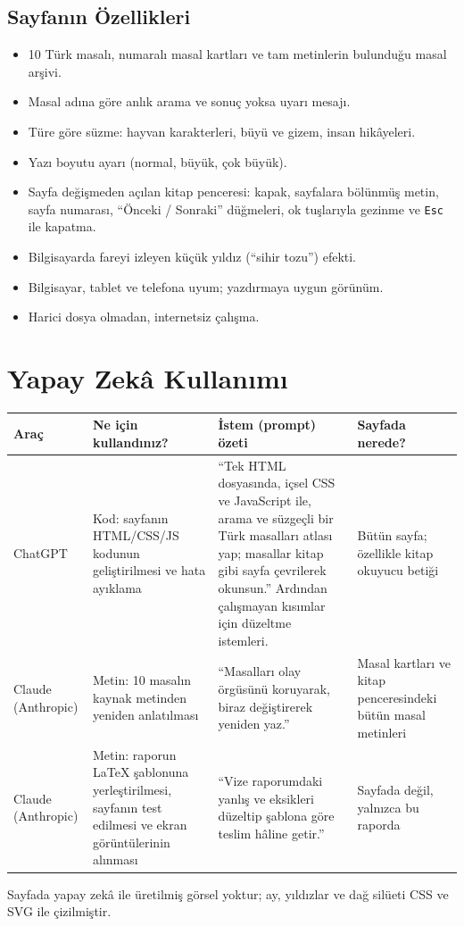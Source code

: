 \documentclass[12pt,a4paper]{article}
\begin{document}
\subsection{Sayfanın Özellikleri}
\begin{itemize}
  \item 10 Türk masalı, numaralı masal kartları ve tam metinlerin bulunduğu masal arşivi.
  \item Masal adına göre anlık arama ve sonuç yoksa uyarı mesajı.
  \item Türe göre süzme: hayvan karakterleri, büyü ve gizem, insan hikâyeleri.
  \item Yazı boyutu ayarı (normal, büyük, çok büyük).
  \item Sayfa değişmeden açılan kitap penceresi: kapak, sayfalara bölünmüş metin, sayfa
  numarası, ``Önceki / Sonraki'' düğmeleri, ok tuşlarıyla gezinme ve \texttt{Esc} ile kapatma.
  \item Bilgisayarda fareyi izleyen küçük yıldız (``sihir tozu'') efekti.
  \item Bilgisayar, tablet ve telefona uyum; yazdırmaya uygun görünüm.
  \item Harici dosya olmadan, internetsiz çalışma.
\end{itemize}

\section{Yapay Zekâ Kullanımı}
\begin{longtable}{@{}>{\raggedright\arraybackslash}p{2.6cm}>{\raggedright\arraybackslash}p{3.6cm}>{\raggedright\arraybackslash}p{4.2cm}>{\raggedright\arraybackslash}p{3.4cm}@{}}
\toprule
\textbf{Araç} & \textbf{Ne için kullandınız?} & \textbf{İstem (prompt) özeti} & \textbf{Sayfada nerede?} \\
\midrule
\endhead
ChatGPT & Kod: sayfanın HTML/CSS/JS kodunun geliştirilmesi ve hata ayıklama & ``Tek HTML dosyasında, içsel CSS ve JavaScript ile, arama ve süzgeçli bir Türk masalları atlası yap; masallar kitap gibi sayfa çevrilerek okunsun.'' Ardından çalışmayan kısımlar için düzeltme istemleri. & Bütün sayfa; özellikle kitap okuyucu betiği \\
Claude (Anthropic) & Metin: 10 masalın kaynak metinden yeniden anlatılması & ``Masalları olay örgüsünü koruyarak, biraz değiştirerek yeniden yaz.'' & Masal kartları ve kitap penceresindeki bütün masal metinleri \\
Claude (Anthropic) & Metin: raporun LaTeX şablonuna yerleştirilmesi, sayfanın test edilmesi ve ekran görüntülerinin alınması & ``Vize raporumdaki yanlış ve eksikleri düzeltip şablona göre teslim hâline getir.'' & Sayfada değil, yalnızca bu raporda \\
\bottomrule
\end{longtable}
Sayfada yapay zekâ ile üretilmiş görsel yoktur; ay, yıldızlar ve dağ silüeti CSS ve SVG
ile çizilmiştir.
\end{document}
